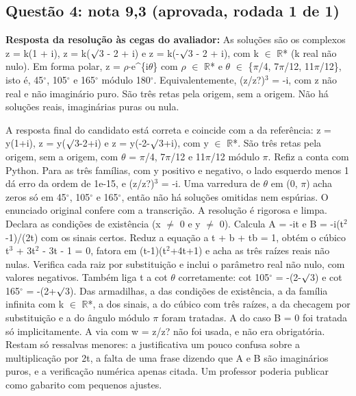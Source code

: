 \documentclass{article}%
\begin{document}
\subsection*{Questão 4: nota 9,3 (aprovada, rodada 1 de 1)}%
\textbf{Resposta da resolução às cegas do avaliador:} As soluções são os complexos z = k(1 + i), z = k($\surd$3 - 2 + i) e z = k(-$\surd$3 - 2 + i), com k $\in$ $\mathbb{R}$* (k real não nulo).\newline%
\newline%
Em forma polar, z = $\rho$$\cdot$e\^{}\{i$\theta$\} com $\rho$ $\in$ $\mathbb{R}$* e $\theta$ $\in$ \{$\pi$/4, 7$\pi$/12, 11$\pi$/12\}, isto é, 45$^\circ$, 105$^\circ$ e 165$^\circ$ módulo 180$^\circ$.\newline%
\newline%
Equivalentemente, (z/z?)$^3$ = -i, com z não real e não imaginário puro. São três retas pela origem, sem a origem. Não há soluções reais, imaginárias puras ou nula.\par %
A resposta final do candidato está correta e coincide com a da referência: z = y(1+i), z = y($\surd$3-2+i) e z = y(-2-$\surd$3+i), com y $\in$ $\mathbb{R}$*. São três retas pela origem, sem a origem, com $\theta$ = $\pi$/4, 7$\pi$/12 e 11$\pi$/12 módulo $\pi$. Refiz a conta com Python. Para as três famílias, com y positivo e negativo, o lado esquerdo menos 1 dá erro da ordem de 1e{-}15, e (z/z?)$^3$ = -i. Uma varredura de $\theta$ em (0, $\pi$) acha zeros só em 45$^\circ$, 105$^\circ$ e 165$^\circ$, então não há soluções omitidas nem espúrias. O enunciado original confere com a transcrição. A resolução é rigorosa e limpa. Declara as condições de existência (x $\neq$ 0 e y $\neq$ 0). Calcula A = -it e B = -i(t$^2$-1)/(2t) com os sinais certos. Reduz a equação a t + b + tb = 1, obtém o cúbico t$^3$ + 3t$^2$ - 3t - 1 = 0, fatora em (t-1)(t$^2$+4t+1) e acha as três raízes reais não nulas. Verifica cada raiz por substituição e inclui o parâmetro real não nulo, com valores negativos. Também liga t a cot $\theta$ corretamente: cot 105$^\circ$ = -(2-$\surd$3) e cot 165$^\circ$ = -(2+$\surd$3). Das armadilhas, a das condições de existência, a da família infinita com k $\in$ $\mathbb{R}$*, a dos sinais, a do cúbico com três raízes, a da checagem por substituição e a do ângulo módulo $\pi$ foram tratadas. A do caso B = 0 foi tratada só implicitamente. A via com w = z/z? não foi usada, e não era obrigatória. Restam só ressalvas menores: a justificativa um pouco confusa sobre a multiplicação por 2t, a falta de uma frase dizendo que A e B são imaginários puros, e a verificação numérica apenas citada. Um professor poderia publicar como gabarito com pequenos ajustes.%
$$
\end{document}
